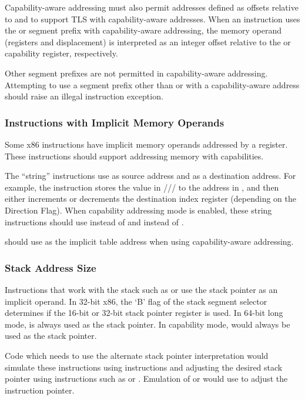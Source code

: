 Capability-aware addressing must also permit addresses defined as
offsets relative to \CFS{} and \CGS{} to support TLS with
capability-aware addresses.  When an instruction uses the \FS{} or
\GS{} segment prefix with capability-aware addressing, the memory
operand (registers and displacement) is interpreted as an integer
offset relative to the \CFS{} or \CGS{} capability register,
respectively.

Other segment prefixes are not permitted in capability-aware
addressing.  Attempting to use a segment prefix other than \FS{} or
\GS{} with a capability-aware address should raise an illegal
instruction exception.

\subsubsection{Instructions with Implicit Memory Operands}

Some x86 instructions have implicit memory operands addressed by a
register.  These instructions should support addressing memory with
capabilities.

The ``string''
instructions use \RSI{} as source address and \RDI{} as a destination address.
For example, the
 instruction stores the value in \AL{}/\AX{}/\EAX{}/\RAX{} to the address in
\RDI{}, and then either increments or decrements the destination
index register (depending on the Direction Flag).  When capability
addressing mode is enabled,
these string instructions should use \CSI{} instead of \RSI{} and \CDI{} instead of
\RDI{}.

 should use \CBX{} as the implicit table address when
using capability-aware addressing.

\subsubsection{Stack Address Size}

Instructions that work with the stack such as  or
 use the stack pointer as an implicit operand.  In
32-bit x86, the `B' flag of the stack segment selector determines if
the 16-bit or 32-bit stack pointer register is used.  In 64-bit long
mode, \RSP{} is always used as the stack pointer.  In capability mode,
\CSP{} would always be used as the stack pointer.

Code which needs to use the alternate stack pointer
interpretation would simulate these instructions using 
instructions and adjusting the desired stack pointer using
instructions such as  or .  Emulation of
 or  would use  to
adjust the instruction pointer.


